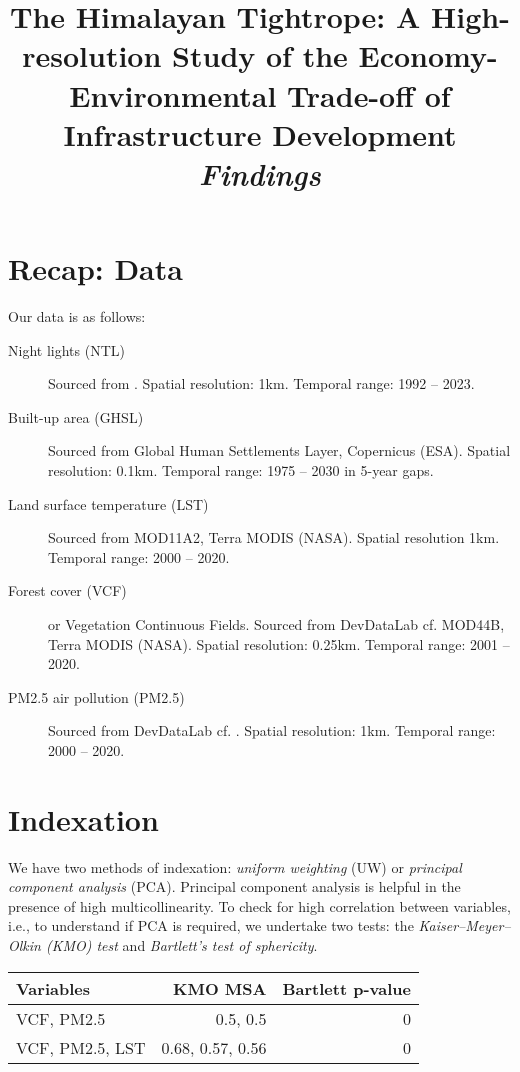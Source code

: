 \documentclass[a4paper,12pt]{article} %
\begin{document}
\title{The Himalayan Tightrope: A High-resolution Study of the Economy-Environmental Trade-off of Infrastructure Development \\[1em]\textit{Findings}}
\date{}
\maketitle

\section{Recap: Data}

Our data is as follows:

\begin{description}
    \item[Night lights (NTL)] Sourced from \textcite{Li2020ntl}. Spatial resolution: 1km. Temporal range: 1992 -- 2023.
    \item[Built-up area (GHSL)] Sourced from Global Human Settlements Layer, Copernicus (ESA). Spatial resolution: 0.1km. Temporal range: 1975 -- 2030 in 5-year gaps.
    \item[Land surface temperature (LST)] Sourced from MOD11A2, Terra MODIS (NASA). Spatial resolution 1km. Temporal range: 2000 -- 2020.
    \item[Forest cover (VCF)] or Vegetation Continuous Fields. Sourced from DevDataLab cf. MOD44B, Terra MODIS (NASA). Spatial resolution: 0.25km. Temporal range: 2001 -- 2020. 
    \item[PM2.5 air pollution (PM2.5)] Sourced from DevDataLab cf. \textcite{van2021pm25}. Spatial resolution: 1km. Temporal range: 2000 -- 2020.
\end{description}

\section{Indexation}

We have two methods of indexation: \textit{uniform weighting} (UW) or \textit{principal component analysis} (PCA). Principal component analysis is helpful in the presence of high multicollinearity. To check for high correlation between variables, i.e., to understand if PCA is required, we undertake two tests: the \textit{Kaiser–Meyer–Olkin (KMO) test} and \textit{Bartlett's test of sphericity}.

\begin{table}[H]
\centering\begin{tabular}{l|r|r}
    Variables       &   KMO MSA         &   Bartlett p-value        \\
    \hline 
    VCF, PM2.5      &   0.5, 0.5        &   0                       \\
    VCF, PM2.5, LST &   0.68, 0.57, 0.56&   0                       \\
    

\end{tabular}
\end{table}
\end{document}
